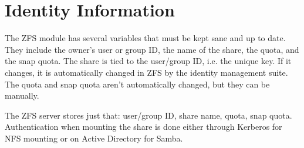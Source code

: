 \section{Identity Information}

The ZFS module has several variables that must be kept sane and up to date. They include the owner's user or group ID, the name of the share, the quota, and the snap quota. The share is tied to the user/group ID, i.e. the unique key. If it changes, it is automatically changed in ZFS by the identity management suite. The quota and snap quota aren't automatically changed, but they can be manually. 

The ZFS server stores just that: user/group ID, share name, quota, snap quota. Authentication when mounting the share is done either through Kerberos for NFS mounting or on Active Directory for Samba. 
